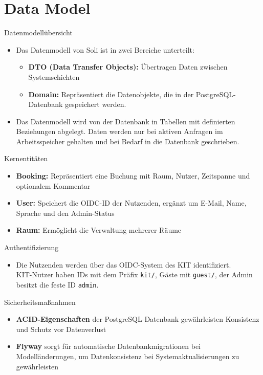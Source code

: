 \documentclass{sdqbeamer}
\begin{document}
\section{Data Model}

\begin{frame}{Datenmodellübersicht}
    \begin{itemize}
        \item Das Datenmodell von Soli ist in zwei Bereiche unterteilt:
        \begin{itemize}
            \item \textbf{DTO (Data Transfer Objects):} Übertragen Daten zwischen Systemschichten
            \item \textbf{Domain:} Repräsentiert die Datenobjekte, die in der PostgreSQL-Datenbank gespeichert werden.
        \end{itemize}
        \item Das Datenmodell wird von der Datenbank in Tabellen mit definierten Beziehungen abgelegt. Daten werden nur bei aktiven Anfragen im Arbeitsspeicher gehalten und bei Bedarf in die Datenbank geschrieben.
    \end{itemize}
\end{frame}

\begin{frame}{Kernentitäten}
    \begin{itemize}
        \item \textbf{Booking:} Repräsentiert eine Buchung mit Raum, Nutzer, Zeitspanne und optionalem Kommentar
        \item \textbf{User:} Speichert die OIDC-ID der Nutzenden, ergänzt um E-Mail, Name, Sprache und den Admin-Status
        \item \textbf{Raum:} Ermöglicht die Verwaltung mehrerer Räume
    \end{itemize}
\end{frame}

\begin{frame}{Authentifizierung}
    \begin{itemize}
        \item Die Nutzenden werden über das OIDC-System des KIT identifiziert.\\ KIT-Nutzer haben IDs mit dem Präfix \texttt{kit/}, Gäste mit \texttt{guest/}, der Admin besitzt die feste ID \texttt{admin}.
    \end{itemize}
\end{frame}

\begin{frame}{Sicherheitsmaßnahmen}
    \begin{itemize}
        \item \textbf{ACID-Eigenschaften} der PostgreSQL-Datenbank gewährleisten Konsistenz und Schutz vor Datenverlust
        \item \textbf{Flyway} sorgt für automatische Datenbankmigrationen bei Modelländerungen, um Datenkonsistenz bei Systemaktualisierungen zu gewährleisten
    \end{itemize}
\end{frame}
\end{document}
